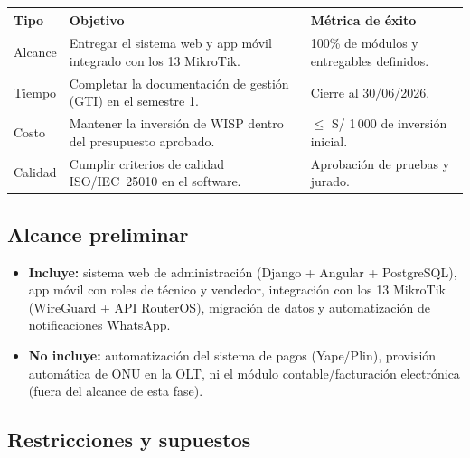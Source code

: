 \begin{center}
\label{tab:objetivos-acta}
\begin{tabularx}{\textwidth}{L{2.2cm} X L{4cm}}
\toprule
\textbf{Tipo} & \textbf{Objetivo} & \textbf{Métrica de éxito} \\
\midrule
Alcance & Entregar el sistema web y app móvil integrado con los 13 MikroTik. &
100\% de módulos y entregables definidos. \\
Tiempo & Completar la documentación de gestión (GTI) en el semestre 1. &
Cierre al 30/06/2026. \\
Costo & Mantener la inversión de WISP dentro del presupuesto aprobado. &
$\leq$ S/ 1\,000 de inversión inicial. \\
Calidad & Cumplir criterios de calidad ISO/IEC~25010 en el software. &
Aprobación de pruebas y jurado. \\
\bottomrule
\end{tabularx}
\end{center}

\subsection{Alcance preliminar}

\begin{itemize}[leftmargin=1.4em]
  \item \textbf{Incluye:} sistema web de administración (Django + Angular +
  PostgreSQL), app móvil con roles de técnico y vendedor, integración con los 13
  MikroTik (WireGuard + API RouterOS), migración de datos y automatización de
  notificaciones WhatsApp.
  \item \textbf{No incluye:} automatización del sistema de pagos (Yape/Plin),
  provisión automática de ONU en la OLT, ni el módulo contable/facturación
  electrónica (fuera del alcance de esta fase).
\end{itemize}

\subsection{Restricciones y supuestos}

